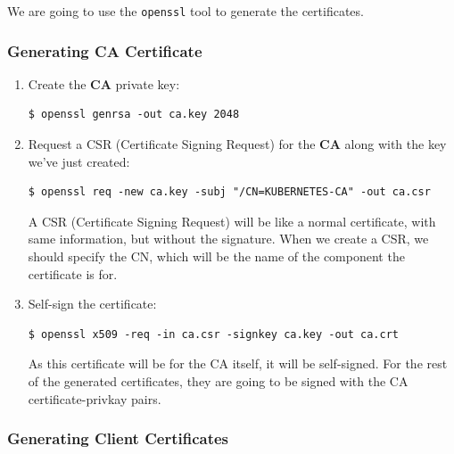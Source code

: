 \documentclass{article}
\newenvironment{blocktemplate}[1]{%
    \tcolorbox[beamer,%
    noparskip,breakable,
    colframe=Blue,%
    colbacklower=LimeGreen!75!LightGreen,%
    title=#1]}%
    {\endtcolorbox}
\newenvironment{blocktemplateI}[1]{%
    \tcolorbox[beamer,%
    noparskip,breakable,
    colframe=Violet,%
    colbacklower=Black,%
    title=#1]}%
    {\endtcolorbox}
\newenvironment{codetemplate}[1][]{%
  \mybasecolorbox[#1]
  \itshape
}{%
  \endmybasecolorbox
}
\begin{document}
We are going to use the \verb|openssl| tool to generate the certificates.

\subsubsection{Generating CA Certificate}

\begin{enumerate}
    \item Create the \textbf{CA} private key:
\begin{codetemplate}{}
\begin{verbatim}
$ openssl genrsa -out ca.key 2048
\end{verbatim}
\end{codetemplate}

    \item Request a CSR (Certificate Signing Request) for the \textbf{CA} along with the key we've just created:
\begin{codetemplate}{}
\begin{verbatim}
$ openssl req -new ca.key -subj "/CN=KUBERNETES-CA" -out ca.csr
\end{verbatim}
\end{codetemplate}
\begin{blocktemplateI}{Note}
A CSR (Certificate Signing Request) will be like a normal certificate, 
with same information, but without the signature. When we create a CSR, 
we should specify the CN, which will be the name of the component the certificate is for.
\end{blocktemplateI}
    \item Self-sign the certificate:
\begin{codetemplate}{}
\begin{verbatim}
$ openssl x509 -req -in ca.csr -signkey ca.key -out ca.crt
\end{verbatim}
\end{codetemplate}
\begin{blocktemplate}{Note}
As this certificate will be for the CA itself, it will be self-signed. For the rest of the generated
certificates, they are going to be signed with the CA certificate-privkay pairs.
\end{blocktemplate}
\end{enumerate}

\subsubsection{Generating Client Certificates}
\end{document}

